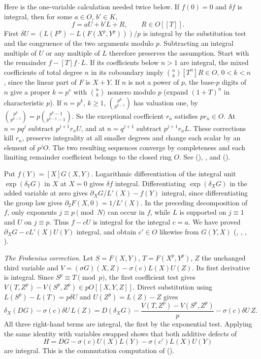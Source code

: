 Here is the one-variable calculation needed twice below. If $f(0)=0$
and $\delta f$ is integral, then for some $a\in O$, $b'\in K$,
\[
                    f=aU+b'L+R,\qquad R\in O[[T]].
\]
First $\delta U=(L(F^p)-L(F(X^p,Y^p)))/p$ is integral by the
substitution test and the congruence of the two arguments modulo $p$.
Subtracting an integral multiple of $U$ or any multiple of $L$
therefore preserves the assumption. Start with the remainder
$f-[T]f\cdot L$. If its coefficients below $n>1$ are integral, the
mixed coefficients of total degree $n$ in its coboundary imply
$\binom nk [T^n]R\in O$, $0<k<n$, since the linear part of $F$ is
$X+Y$. If $n$ is not a power of $p$, the base-$p$ digits of $n$ give
a proper $k=p^s$ with $\binom nk$ nonzero modulo $p$ (expand
$(1+T)^n$ in characteristic $p$). If $n=p^k$, $k\ge1$,
$\binom{p^k}{p^{k-1}}$ has valuation one, by
$\binom{p^k}{p^{k-1}}=p\binom{p^k-1}{p^{k-1}-1}$.
So the exceptional coefficient $r_n$ satisfies $p r_n\in O$.
At $n=p q^j$ subtract $p^{j+1}r_n U$, and at $n=q^{j+1}$
subtract $p^{j+1}r_n L$. These corrections kill $r_n$, preserve
integrality at all smaller degrees and change each scalar by an
element of $p^j O$. The two resulting sequences converge by
completeness and each limiting remainder coefficient belongs to the
closed ring $O$. See  (),
,  and 
().

Put $f(Y)=[X]G(X,Y)$. Logarithmic differentiation of the integral
unit $\exp(\delta_Y G)$ in $X$ at $X=0$ gives $\delta f$ integral.
Differentiating $\exp(\delta_XG)$ in the added variable at zero gives
$\partial_X G/L'(X)-f(Y)$ integral, since differentiating the group
law gives $\partial_2F(X,0)=1/L'(X)$. In the preceding decomposition
of $f$, only exponents $j\equiv p\pmod N$ can occur in $f$, while
$L$ is supported on $j\equiv1$ and $U$ on $j\equiv p$.
Thus $f-cU$ is integral for the integral $c=a$. We have proved
$\partial_X G-cL'(X)U(Y)$ integral, and obtain $c'\in O$ likewise
from $G(Y,X)$ (, , ,
).

\emph{The Frobenius correction.} Let $S=F(X,Y)$, $T=F(X^p,Y^p)$,
$Z$ the unchanged third variable and
$V=(\sigma G)(X,Z)-\sigma(c)L(X)U(Z)$. Its first derivative is
integral. Since $S^p\equiv T\pmod p$, the first coefficient test gives
$V(T,Z^p)-V(S^p,Z^p)\in pO[[X,Y,Z]]$. Direct substitution using
$L(S^p)-L(T)=p\delta U$ and $U(Z^p)=L(Z)-Z$ gives
\[
 \delta_X(DG)-\sigma(c)\delta U\, L(Z)
 =D(\delta_XG)-\frac{V(T,Z^p)-V(S^p,Z^p)}p-\sigma(c)\delta U\,Z.
\]
All three right-hand terms are integral, the first by the exponential
test. Applying the same identity with variables swapped shows that both
additive defects of
\[
 H=DG-\sigma(c)U(X)L(Y)-\sigma(c')L(X)U(Y)
\]
are integral. This is the commutation computation of 
().

